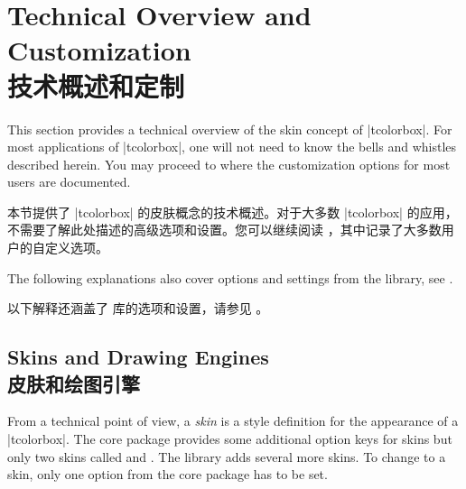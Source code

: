 
\setcounter{section}{8}
\setcounter{subsection}{4}
\setcounter{subsubsection}{0}

% 
\section{Technical Overview and Customization \\技术概述和定制}\label{sec:technical}%
%
This section provides a technical overview of the skin concept of |tcolorbox|.
For most applications of |tcolorbox|, one will not need to know the bells and
whistles described herein.
You may proceed to  where the customization options
for most users are documented.


本节提供了 |tcolorbox| 的皮肤概念的技术概述。对于大多数 |tcolorbox| 的应用，不需要了解此处描述的高级选项和设置。您可以继续阅读 ，其中记录了大多数用户的自定义选项。

The following explanations also cover options and settings from the  library,
see  .

以下解释还涵盖了  库的选项和设置，请参见 。

% 
\subsection{Skins and Drawing Engines\\皮肤和绘图引擎}\label{sec:skincorekeys}

From a technical point of view, a \emph{skin} is a style definition for the
appearance of a |tcolorbox|. The core package provides some additional
option keys for skins but only two skins called 
and .
The  library adds several more skins. To change to a skin, only one
option from the core package has to be set.

